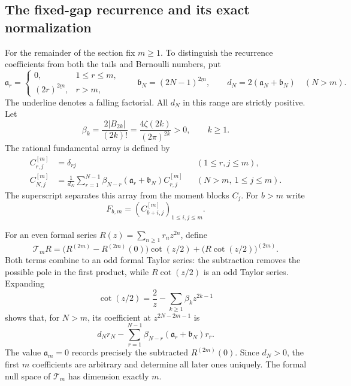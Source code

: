 \subsection{The fixed-gap recurrence and its exact normalization}

For the remainder of the section fix $m\ge1$.  To distinguish the
recurrence coefficients from both the tails and Bernoulli numbers, put
\begin{equation}\label{gb:recurrence-factors}
 \mathfrak a_r=\begin{cases}
 0,&1\le r\le m,\\
 (2r)^{\underline{2m}},&r>m,
 \end{cases}
 \qquad
 \mathfrak b_N=(2N-1)^{\underline{2m}},\qquad
 d_N=2(\mathfrak a_N+\mathfrak b_N)\quad(N>m).
\end{equation}
The underline denotes a falling factorial.  All $d_N$ in this range
are strictly positive.  Let
\begin{equation}\label{gb:beta}
 \beta_k=\frac{2|B_{2k}|}{(2k)!}
        =\frac{4\zeta(2k)}{(2\pi)^{2k}}>0,
 \qquad k\ge1.
\end{equation}
The rational fundamental array is defined by
\begin{align}
 C^{[m]}_{r,j}&=\delta_{rj}&& (1\le r,j\le m),\label{gb:initial}\\
 C^{[m]}_{N,j}&=\frac1{d_N}\sum_{r=1}^{N-1}
   \beta_{N-r}(\mathfrak a_r+\mathfrak b_N)C^{[m]}_{r,j}
       &&(N>m,\ 1\le j\le m).\label{gb:recurrence}
\end{align}
The superscript separates this array from the moment blocks $C_j$.
For $b>m$ write
\begin{equation}\label{gb:F}
                  F_{b,m}=(C^{[m]}_{b+i,j})_{1\le i,j\le m}.
\end{equation}

For an even formal series $R(z)=\sum_{n\ge1}r_nz^{2n}$, define
\begin{equation}\label{gb:cot-operator}
 \mathcal T_mR
 =\bigl(R^{(2m)}-R^{(2m)}(0)\bigr)\cot(z/2)
                      +\bigl(R\cot(z/2)\bigr)^{(2m)}.
\end{equation}
Both terms combine to an odd formal Taylor series: the subtraction
removes the possible pole in the first product, while $R\cot(z/2)$
is an odd Taylor series.  Expanding
\[
 \cot(z/2)=\frac2z-\sum_{k\ge1}\beta_kz^{2k-1}
\]
shows that, for $N>m$, its coefficient at $z^{2N-2m-1}$ is
\begin{equation}\label{gb:coefficient}
 d_Nr_N-\sum_{r=1}^{N-1}
      \beta_{N-r}(\mathfrak a_r+\mathfrak b_N)r_r.
\end{equation}
The value $\mathfrak a_m=0$ records precisely the subtracted
$R^{(2m)}(0)$.  Since $d_N>0$, the first $m$ coefficients are
arbitrary and determine all later ones uniquely.  The formal null
space of $\mathcal T_m$ has dimension exactly $m$.

